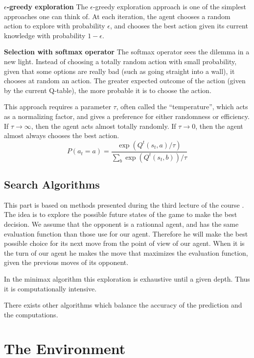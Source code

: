 \documentclass[journal, a4paper]{IEEEtran}
\begin{document}
\textbf{$\epsilon$-greedy exploration}
The $\epsilon$-greedy exploration approach is one of the simplest approaches one can think of.
At each iteration, the agent chooses a random action to explore with probability $\epsilon$, and chooses the best action given its current knowledge with probability $1-\epsilon$.
\cite{lecture-rl}
\cite{lecture-rl2}
\cite{intro-rl}

\textbf{Selection with softmax operator}
The softmax operator sees the dilemma in a new light.
Instead of choosing a totally random action with small probability, given that some options are really bad (such as going straight into a wall), it chooses at random an action.
The greater expected outcome of the action (given by the current Q-table), the more probable it is to choose the action.

This approach requires a parameter $\tau$, often called the ``temperature'', which acts as a normalizing factor, and gives a preference for either randomness or efficiency.
If $\tau \to \infty$, then the agent acts almost totally randomly.
If $\tau \to 0$, then the agent almost always chooses the best action.
\cite{intro-rl}
\[
    P\left(a_t = a\right) = \frac{\exp\left(Q^t(s_t, a) / \tau\right)}{\sum\limits_b \exp\left(Q^t(s_t, b)\right) / \tau}
\]


\subsection{Search Algorithms}
This part is based on methods presented during the third lecture of the course \cite{lecture_minimax}. The idea is to explore the possible future states of the game to make the best decision. We assume that the opponent is a rationnal agent, and has the same evaluation function than those use for our agent. Therefore he will make the best possible choice for its next move from the point of view of our agent. When it is the turn of our agent he makes the move that maximizes the evaluation function, given the previous moves of its opponent.

In the minimax algorithm this exploration is exhaustive until a given depth. Thus it is computationally intensive.

There exists other algorithms which balance the accuracy of the prediction and the computations.

\section{The Environment}
\end{document}
